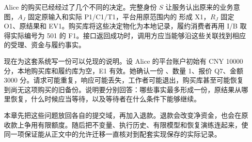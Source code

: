 \newcommand{\CFifteenFigure}[3]{%
  \begin{figure}[htbp]
  \centering
  \begingroup
  \definecolor{Blue}{HTML}{315E76}
  \definecolor{Gold}{HTML}{A96B34}
  \tikzset{every node/.style={font=\small\sffamily,align=center},
    box/.style={draw=Blue,rounded corners=2pt,fill=blue!3,inner sep=6pt,
      text width=3.4cm,minimum height=.8cm},
    good/.style={box,draw=green!35!black,fill=green!4},
    warn/.style={box,draw=Gold,fill=orange!5},
    arr/.style={-{Stealth[length=2mm]},thick,draw=Blue},
    note/.style={font=\footnotesize\sffamily,align=center,text=black!75},
    lane/.style={draw=black!30,densely dashed},
    cell/.style={draw=Blue,minimum width=2.2cm,minimum height=.7cm,
      fill=blue!3,inner sep=3pt}}
  \resizebox{.98\linewidth}{!}{}
  \endgroup
  \caption{#2}\label{#3}
  \end{figure}}

Alice 的购买已经经过了几个不同的决定。完整身份 $S$ 让服务认出原来的业务意图，$A_J$ 固定原输入和实际 P1/C1/T1，平台用原范围内的  形成 X1，$R_J$ 固定 O1、原结果和 EV1。购买库将这些决定物化为本地记录，履约消费者再用 I/B 取得实际编号为 501 的 F1。接口返回成功时，调用方应当能够沿这些关联找到相应的受理、资金与履约事实。

现在为这套系统写一份可以兑现的说明。设 Alice 的平台账户初始有 CNY 10000 分，本地购买库和履约库为空，E1 有效。她确认一份 、数量 1、报价 Q7、金额 3000 分。请求可能重复，响应可能丢失，工作者可能退出，购买库甚至可能恢复到尚无这项购买的旧备份。说明要分别回答：哪些事实最多形成一份，原结果从哪里恢复，什么时候应当等待，以及等待者在什么条件下能够继续。

本章先把这些问题放回各自的提交域，再加入退款。退款会改变净资金，也会在原收款上争用有限额度。随后把不变量、执行历史、有限模型和恢复演练连起来，使同一项保证能从正文中的允许迁移一直核对到配套实现保存的实际记录。
